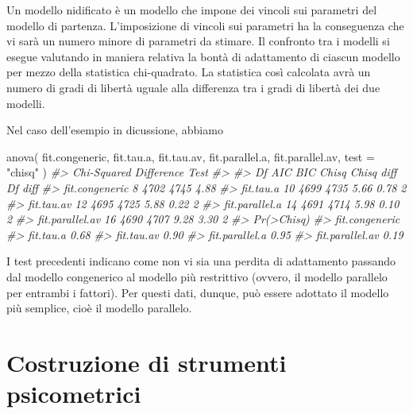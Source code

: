 \documentclass[
  11pt,
]{krantz}
\makeatletter
\newenvironment{Shaded}{\begin{snugshade}}{\end{snugshade}}
\newcommand{\AttributeTok}[1]{\textcolor[rgb]{0.61,0.61,0.61}{#1}}
\newcommand{\CommentTok}[1]{\textcolor[rgb]{0.37,0.37,0.37}{\textit{#1}}}
\newcommand{\FunctionTok}[1]{\textcolor[rgb]{0,0,0}{#1}}
\newcommand{\NormalTok}[1]{#1}
\newcommand{\StringTok}[1]{\textcolor[rgb]{0.5,0.5,0.5}{#1}}
\newenvironment{kframe}{%
\medskip{}
\setlength{\fboxsep}{.8em}
 \def\at@end@of@kframe{}%
 \ifinner\ifhmode%
  \def\at@end@of@kframe{\end{minipage}}%
  \begin{minipage}{\columnwidth}%
 \fi\fi%
 \def\FrameCommand##1{\hskip\@totalleftmargin \hskip-\fboxsep
 \colorbox{shadecolor}{##1}\hskip-\fboxsep
     \hskip-\linewidth \hskip-\@totalleftmargin \hskip\columnwidth}%
 \MakeFramed {\advance\hsize-\width
   \@totalleftmargin\z@ \linewidth\hsize
   \@setminipage}}%
 {\par\unskip\endMakeFramed%
 \at@end@of@kframe}
\renewenvironment{Shaded}{\begin{kframe}}{\end{kframe}}
\theoremstyle{definition}
\theoremstyle{definition}
\theoremstyle{definition}
\theoremstyle{definition}
\theoremstyle{remark}
\makeatother
\begin{document}
Un modello nidificato è un modello che impone dei vincoli sui parametri del modello di partenza. L'imposizione di vincoli sui parametri ha la conseguenza che vi sarà un numero minore di parametri da stimare. Il confronto tra i modelli si esegue valutando in maniera relativa la bontà di adattamento di ciascun modello per mezzo della statistica chi-quadrato. La statistica così calcolata avrà un numero di gradi di libertà uguale alla differenza tra i gradi di libertà dei due modelli.

Nel caso dell'esempio in dicussione, abbiamo

\begin{Shaded}
\begin{Highlighting}[]
\FunctionTok{anova}\NormalTok{(}
\NormalTok{  fit.congeneric,}
\NormalTok{  fit.tau.a,}
\NormalTok{  fit.tau.av,}
\NormalTok{  fit.parallel.a,}
\NormalTok{  fit.parallel.av,}
  \AttributeTok{test =} \StringTok{"chisq"}
\NormalTok{)}
\CommentTok{\#\textgreater{} Chi{-}Squared Difference Test}
\CommentTok{\#\textgreater{} }
\CommentTok{\#\textgreater{}                 Df  AIC  BIC Chisq Chisq diff Df diff}
\CommentTok{\#\textgreater{} fit.congeneric   8 4702 4745  4.88                   }
\CommentTok{\#\textgreater{} fit.tau.a       10 4699 4735  5.66       0.78       2}
\CommentTok{\#\textgreater{} fit.tau.av      12 4695 4725  5.88       0.22       2}
\CommentTok{\#\textgreater{} fit.parallel.a  14 4691 4714  5.98       0.10       2}
\CommentTok{\#\textgreater{} fit.parallel.av 16 4690 4707  9.28       3.30       2}
\CommentTok{\#\textgreater{}                 Pr(\textgreater{}Chisq)}
\CommentTok{\#\textgreater{} fit.congeneric            }
\CommentTok{\#\textgreater{} fit.tau.a             0.68}
\CommentTok{\#\textgreater{} fit.tau.av            0.90}
\CommentTok{\#\textgreater{} fit.parallel.a        0.95}
\CommentTok{\#\textgreater{} fit.parallel.av       0.19}
\end{Highlighting}
\end{Shaded}

I test precedenti indicano come non vi sia una perdita di adattamento passando dal modello congenerico al modello più restrittivo (ovvero, il modello parallelo per entrambi i fattori). Per questi dati, dunque, può essere adottato il modello più semplice, cioè il modello parallelo.

\hypertarget{part-costruzione-di-strumenti-psicometrici}{%
\part{Costruzione di strumenti psicometrici}\label{part-costruzione-di-strumenti-psicometrici}}
\end{document}
